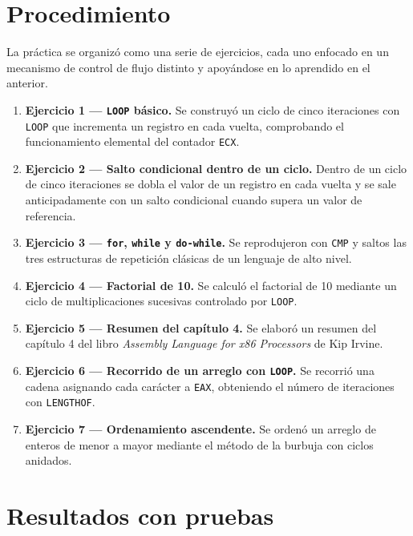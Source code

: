 \documentclass[a4paper,12pt]{article}
\begin{document}
\section{Procedimiento}
La práctica se organizó como una serie de ejercicios, cada uno enfocado en un mecanismo de control de flujo distinto y apoyándose en lo aprendido en el anterior.

\begin{enumerate}[label=\textbf{\arabic*.}]
    \item \textbf{Ejercicio 1 --- \texttt{LOOP} básico.} Se construyó un ciclo de cinco iteraciones con \texttt{LOOP} que incrementa un registro en cada vuelta, comprobando el funcionamiento elemental del contador \texttt{ECX}.

    \item \textbf{Ejercicio 2 --- Salto condicional dentro de un ciclo.} Dentro de un ciclo de cinco iteraciones se dobla el valor de un registro en cada vuelta y se sale anticipadamente con un salto condicional cuando supera un valor de referencia.

    \item \textbf{Ejercicio 3 --- \texttt{for}, \texttt{while} y \texttt{do-while}.} Se reprodujeron con \texttt{CMP} y saltos las tres estructuras de repetición clásicas de un lenguaje de alto nivel.

    \item \textbf{Ejercicio 4 --- Factorial de 10.} Se calculó el factorial de 10 mediante un ciclo de multiplicaciones sucesivas controlado por \texttt{LOOP}.

    \item \textbf{Ejercicio 5 --- Resumen del capítulo 4.} Se elaboró un resumen del capítulo 4 del libro \textit{Assembly Language for x86 Processors} de Kip Irvine.

    \item \textbf{Ejercicio 6 --- Recorrido de un arreglo con \texttt{LOOP}.} Se recorrió una cadena asignando cada carácter a \texttt{EAX}, obteniendo el número de iteraciones con \texttt{LENGTHOF}.

    \item \textbf{Ejercicio 7 --- Ordenamiento ascendente.} Se ordenó un arreglo de enteros de menor a mayor mediante el método de la burbuja con ciclos anidados.
\end{enumerate}

\section{Resultados con pruebas}
\end{document}
